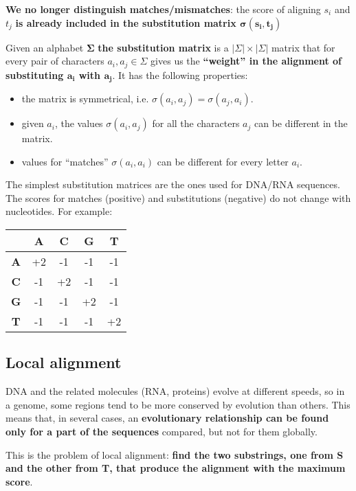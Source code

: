 \documentclass[../main.tex]{subfiles}
\begin{document}
\textbf{We no longer distinguish matches/mismatches}: the score of aligning $s_i$ and $t_j$ \textbf{is already included in the substitution matrix $\bm{\sigma(s_i, t_j)}$}

Given an alphabet $\bm{\Sigma}$\textbf{ the substitution matrix} is a $|\Sigma|\times|\Sigma|$ matrix that for every pair of characters $a_i, a_j \in \Sigma$ gives us the \textbf{``weight'' in the alignment of substituting $\mathbf{a_i}$ with $\mathbf{a_j}$}. It has the following properties:
\begin{itemize}
\item the matrix is symmetrical, i.e. $\sigma(a_i, a_j) = \sigma(a_j, a_i)$.
\item given $a_i$, the values $\sigma(a_i, a_j)$ for all the characters $a_j$ can be different in the matrix.
\item values for ``matches'' $\sigma(a_i, a_i)$ can be different for every letter $a_i$.
\end{itemize}

The simplest substitution matrices are the ones used for DNA/RNA sequences. The scores for matches (positive) and substitutions (negative) do not change with nucleotides. For example:

\begin{center}
\begin{tabular}{|c|c|c|c|c|}
\hline
& \textbf{A} & \textbf{C} & \textbf{G} & \textbf{T} \\
\hline
\textbf{A} & +2 & -1 & -1 & -1 \\
\hline
\textbf{C} & -1 & +2 & -1 & -1 \\
\hline
\textbf{G} & -1 & -1 & +2 & -1 \\
\hline
\textbf{T} & -1 & -1 & -1 & +2 \\
\hline
\end{tabular}
\end{center}

\subsection{Local alignment}

DNA and the related molecules (RNA, proteins) evolve at different speeds, so in a genome, some regions tend to be more conserved by evolution than others. This means that, in several cases, an \textbf{evolutionary relationship can be found only for a part of the sequences} compared, but not for them globally.

This is the problem of local alignment: \textbf{find the two substrings, one from S and the other from T, that produce the alignment with the maximum score}.
\end{document}
